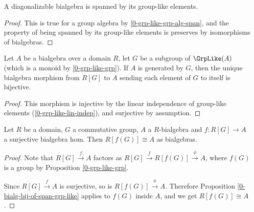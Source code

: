 \begin{lemma}
  \label{0-is-diag-bialg-group-like-span}
  \leanok

  A diagonalizable bialgebra is spanned by its group-like elements.
\end{lemma}
\begin{proof}
  \leanok

  This is true for a group algebra by \ref{0-grp-like-grp-alg-span}, and the
  property of being spanned by its group-like elements is preserves by
  isomorphisms of bialgebras.
\end{proof}


\begin{proposition}
  \label{0-bialg-bij-of-span-grp-like}

  Let $A$ be a bialgebra over a domain $R$,
  let $G$ be a subgroup of $\GrpLike(A)$ (which is a monoid by \ref{0-grp-like-grp}).
  If $A$ is generated by $G$,
  then the unique bialgebra morphism from $R[G]$ to $A$
  sending each element of $G$ to itself is bijective.
\end{proposition}
\begin{proof}
  \leanok

  This morphism is injective by the linear independence of group-like elements
  (\ref{0-grp-like-lin-indep}), and surjective by assumption.
\end{proof}


\begin{proposition}
  \label{0-is-diag-bialg-quot}

  Let $R$ be a domain, $G$ a commutative group,
  $A$ a $R$-bialgebra and $f : R[G] \to A$ a surjective bialgebra hom.
  Then $R[f(G)] \cong A$ as bialgebras.
\end{proposition}
\begin{proof}

  Note that $R[G] \xrightarrow f A$ factors as $R[G] \xrightarrow f R[f(G)] \xrightarrow\phi A$,
  where $f(G)$ is a group by Proposition \ref{0-grp-like-grp}.

  Since $R[G] \xrightarrow f A$ is surjective, so is $R[f(G)] \xrightarrow\phi A$.
  Therefore Proposition \ref{0-bialg-bij-of-span-grp-like} applies to $f(G)$ inside $A$,
  and we get $R[f(G)] \cong A$.
\end{proof}


